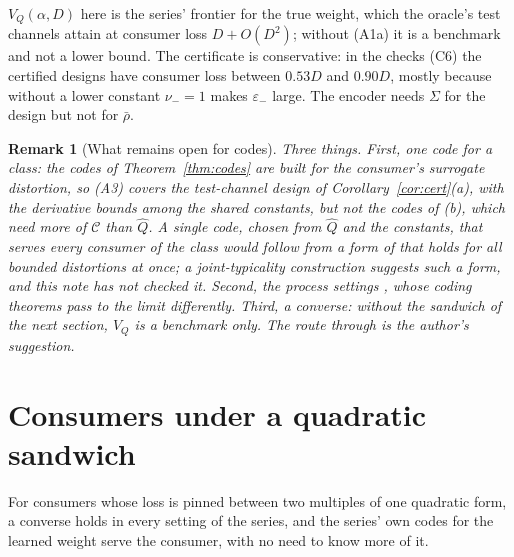 \documentclass[11pt,onecolumn]{IEEEtran}
\newtheorem{remark}[theorem]{Remark}
\newcommand{\num}{\nu_{-}}
\newcommand{\emm}{\varepsilon_{-}}
\begin{document}
$V_Q(\alpha,D)$ here is the series' frontier for the true weight, which the oracle's
test channels attain at consumer loss $D+O(D^2)$; without (A1a) it is a benchmark and not a
lower bound. The certificate is conservative: in the checks (C6) the certified designs
have consumer loss between $0.53D$ and $0.90D$, mostly because without a lower constant
$\num=1$ makes $\emm$ large. The encoder needs $\Sigma$ for the design but not for
$\bar\rho$.

\begin{remark}[What remains open for codes]\label{rem:open}
Three things. First, one code for a class: the codes of Theorem~\ref{thm:codes} are
built for the consumer's surrogate distortion, so (A3) covers the test-channel design of
Corollary~\ref{cor:cert}(a), with the derivative bounds among the shared constants, but
not the codes of (b), which need more of $\mathcal C$ than $\hat Q$. A single code, chosen from $\hat Q$ and the constants, that serves every
consumer of the class would follow from a form of \cite[Lemma~A]{part1} that holds for
all bounded distortions at once; a joint-typicality construction suggests such a form,
and this note has not checked it. Second, the process settings
\cite{part2,part3,part4}, whose coding theorems pass to the limit differently. Third, a
converse: without the sandwich of the next section, $V_Q$ is a benchmark only. The
route through \cite[App.~A]{part1} is the author's suggestion.
\end{remark}

\section{Consumers under a quadratic sandwich}\label{sec:sandwich}

For consumers whose loss is pinned between two multiples of one quadratic form, a
converse holds in every setting of the series, and the series' own codes for the
learned weight serve the consumer, with no need to know more of it.
\end{document}
